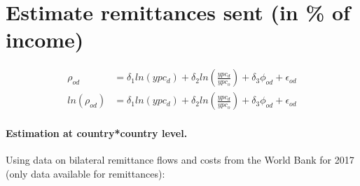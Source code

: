 \documentclass[letterpaper,11pt]{article}
\begin{document}
\section{Estimate remittances sent (in \% of income)}

\begin{align} \label{eq:estim_rho}
	\rho_{od} &= \delta_1 ln(ypc_d) + \delta_2 ln(\frac{ypc_d}{ypc_o}) + \delta_3 \phi_{od} + \epsilon_{od} \nonumber \\
	ln(\rho_{od}) &= \delta_1 ln(ypc_d) + \delta_2 ln(\frac{ypc_d}{ypc_o}) + \delta_3 \phi_{od} + \epsilon_{od}
\end{align}


\paragraph{Estimation at country*country level.}
Using data on bilateral remittance flows and costs from the World Bank for 2017 (only data available for remittances):
\end{document}
